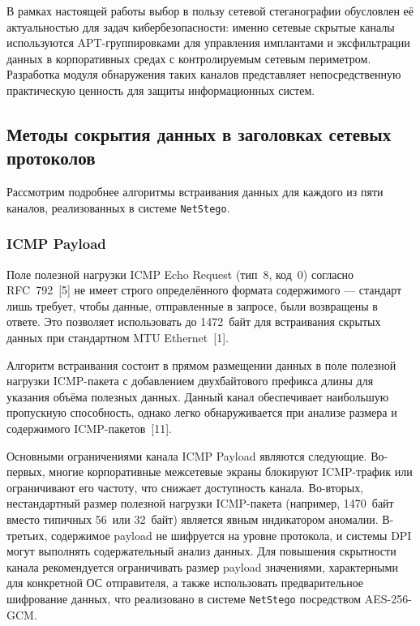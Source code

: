 В рамках настоящей работы выбор в пользу сетевой стеганографии обусловлен её актуальностью для задач кибербезопасности: именно сетевые скрытые каналы используются APT-группировками для управления имплантами и эксфильтрации данных в корпоративных средах с контролируемым сетевым периметром. Разработка модуля обнаружения таких каналов представляет непосредственную практическую ценность для защиты информационных систем.

\subsection{Методы сокрытия данных в заголовках сетевых протоколов}

Рассмотрим подробнее алгоритмы встраивания данных для каждого из пяти каналов, реализованных в системе \texttt{NetStego}.

\subsubsection{ICMP Payload}

Поле полезной нагрузки ICMP Echo Request (тип~8, код~0) согласно RFC~792~[5] не имеет строго определённого формата содержимого --- стандарт лишь требует, чтобы данные, отправленные в запросе, были возвращены в ответе. Это позволяет использовать до 1472~байт для встраивания скрытых данных при стандартном MTU Ethernet~[1].

Алгоритм встраивания состоит в прямом размещении данных в поле полезной нагрузки ICMP-пакета с добавлением двухбайтового префикса длины для указания объёма полезных данных. Данный канал обеспечивает наибольшую пропускную способность, однако легко обнаруживается при анализе размера и содержимого ICMP-пакетов~[11].

Основными ограничениями канала ICMP Payload являются следующие. Во-первых, многие корпоративные межсетевые экраны блокируют ICMP-трафик или ограничивают его частоту, что снижает доступность канала. Во-вторых, нестандартный размер полезной нагрузки ICMP-пакета (например, 1470~байт вместо типичных 56~или 32~байт) является явным индикатором аномалии. В-третьих, содержимое payload не шифруется на уровне протокола, и системы DPI могут выполнять содержательный анализ данных. Для повышения скрытности канала рекомендуется ограничивать размер payload значениями, характерными для конкретной ОС отправителя, а также использовать предварительное шифрование данных, что реализовано в системе \texttt{NetStego} посредством AES-256-GCM.

